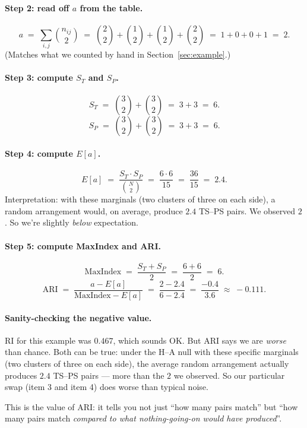 \documentclass[11pt]{article}
\begin{document}
\paragraph{Step 2: read off $a$ from the table.}
\[
  a \;=\; \sum_{i,j} \binom{n_{ij}}{2}
       \;=\; \binom{2}{2} + \binom{1}{2} + \binom{1}{2} + \binom{2}{2}
       \;=\; 1 + 0 + 0 + 1 \;=\; 2.
\]
(Matches what we counted by hand in Section~\ref{sec:example}.)

\paragraph{Step 3: compute $S_T$ and $S_P$.}
\[
  S_T \;=\; \binom{3}{2} + \binom{3}{2} \;=\; 3 + 3 \;=\; 6.
\]
\[
  S_P \;=\; \binom{3}{2} + \binom{3}{2} \;=\; 3 + 3 \;=\; 6.
\]

\paragraph{Step 4: compute $E[a]$.}
\[
  E[a] \;=\; \frac{S_T \cdot S_P}{\binom{N}{2}}
        \;=\; \frac{6 \cdot 6}{15} \;=\; \frac{36}{15} \;=\; 2.4.
\]
Interpretation: with these marginals (two clusters of three on each side),
a random arrangement would, on average, produce $2.4$ TS--PS pairs. We
observed $2$. So we're slightly \emph{below} expectation.

\paragraph{Step 5: compute MaxIndex and ARI.}
\[
  \mathrm{MaxIndex} \;=\; \frac{S_T + S_P}{2} \;=\; \frac{6 + 6}{2} \;=\; 6.
\]
\[
  \text{ARI} \;=\; \frac{a - E[a]}{\mathrm{MaxIndex} - E[a]}
         \;=\; \frac{2 - 2.4}{6 - 2.4} \;=\; \frac{-0.4}{3.6}
         \;\approx\; -0.111.
\]

\paragraph{Sanity-checking the negative value.}
RI for this example was $0.467$, which sounds OK. But ARI says we are
\emph{worse} than chance. Both can be true: under the H--A null with
these specific marginals (two clusters of three on each side), the
average random arrangement actually produces $2.4$ TS--PS pairs --- more
than the $2$ we observed. So our particular swap (item 3 and item 4) does
worse than typical noise.

This is the value of ARI: it tells you not just ``how many pairs match''
but ``how many pairs match \emph{compared to what nothing-going-on would
have produced}''.
\end{document}
